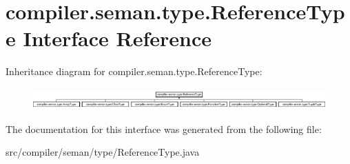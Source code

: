 \hypertarget{interfacecompiler_1_1seman_1_1type_1_1_reference_type}{}\section{compiler.\+seman.\+type.\+Reference\+Type Interface Reference}
\label{interfacecompiler_1_1seman_1_1type_1_1_reference_type}
Inheritance diagram for compiler.\+seman.\+type.\+Reference\+Type\+:\begin{figure}[H]
\begin{center}
\leavevmode
\includegraphics[height=0.822320cm]{interfacecompiler_1_1seman_1_1type_1_1_reference_type}
\end{center}
\end{figure}


The documentation for this interface was generated from the following file\+:\begin{DoxyCompactItemize}
\item 
src/compiler/seman/type/Reference\+Type.\+java\end{DoxyCompactItemize}
